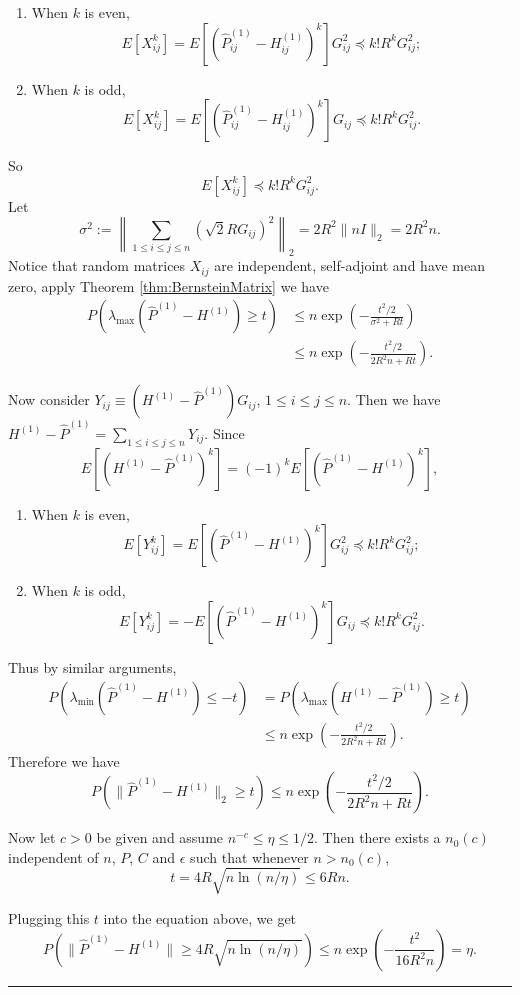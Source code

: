 \documentclass[a4paper]{article}
\newenvironment{proof}{{\bf Proof:  }}{\hfill\rule{2mm}{2mm}}
\begin{document}
\begin{proof}
\begin{enumerate}
\item When $k$ is even,
\[
E[X_{ij}^k] = E[(\hat{P}^{(1)}_{ij} - H^{(1)}_{ij})^k] G_{ij}^2 \preceq k! R^k G_{ij}^2;
\]
\item When $k$ is odd,
\[
E[X_{ij}^k] = E[(\hat{P}^{(1)}_{ij} - H^{(1)}_{ij})^k] G_{ij} \preceq k! R^k G_{ij}^2.
\]
\end{enumerate}
So
\[
E[X_{ij}^k] \preceq k! R^k G_{ij}^2.
\]
Let
\[
	\sigma^2 := \left\| \sum_{1 \le i \le j \le n} (\sqrt{2} R G_{ij})^2 \right\|_2 = 2 R^2 \| n I \|_2 = 2 R^2 n.
\]
Notice that random matrices $X_{ij}$ are independent, self-adjoint and have mean zero, apply Theorem \ref{thm:BernsteinMatrix} we have
\begin{align*}
	P \left( \lambda_{\max}(\hat{P}^{(1)} - H^{(1)}) \ge t \right) &
    \le n \exp \left( - \frac{t^2/2}{\sigma^2 + R t} \right) \\
    & \le n \exp \left( - \frac{t^2/2}{2 R^2 n + R t} \right).
\end{align*}

Now consider $Y_{ij} \equiv \left( H^{(1)} - \hat{P}^{(1)} \right) G_{ij}$, $1 \le i \le j \le n$. Then we have $H^{(1)} - \hat{P}^{(1)} = \sum_{1 \le i \le j \le n} Y_{ij}$.
Since
\[
	E[(H^{(1)} - \hat{P}^{(1)})^k]
    = (-1)^k E[(\hat{P}^{(1)} - H^{(1)})^k],
\]
\begin{enumerate}
\item When $k$ is even,
\[
E[Y_{ij}^k] = E[(\hat{P}^{(1)} - H^{(1)})^k] G_{ij}^2 \preceq k! R^k G_{ij}^2;
\]
\item When $k$ is odd,
\[
E[Y_{ij}^k] = - E[(\hat{P}^{(1)} - H^{(1)})^k] G_{ij} \preceq k! R^k G_{ij}^2.
\]
\end{enumerate}
Thus by similar arguments,
\begin{align*}
	P \left( \lambda_{\min}(\hat{P}^{(1)} - H^{(1)}) \le -t \right) &
    = P \left( \lambda_{\max}(H^{(1)} - \hat{P}^{(1)}) \ge t \right) \\
    & \le n \exp \left( - \frac{t^2/2}{2 R^2 n + R t} \right).
\end{align*}
Therefore we have
\[
	P \left( \| \hat{P}^{(1)} - H^{(1)} \|_2 \ge t \right)
    \le n \exp \left( - \frac{t^2/2}{2 R^2 n + R t} \right).
\]

Now let $c > 0$ be given and assume $n^{-c} \le \eta \le 1/2$. Then there exists a $n_0(c)$ independent of $n$, $P$, $C$ and $\epsilon$ such that whenever $n > n_0(c)$,
\[
	t =  4 R \sqrt{n \ln(n/\eta)} \le 6 R n.
\]

Plugging this $t$ into the equation above, we get
\[
	P(\| \hat{P}^{(1)} - H^{(1)} \| \ge 4 R \sqrt{n \ln(n/\eta)})
    \le n \exp\left(-\frac{t^2}{16 R^2 n}\right) = \eta.
\]
\end{proof}
\end{document}

